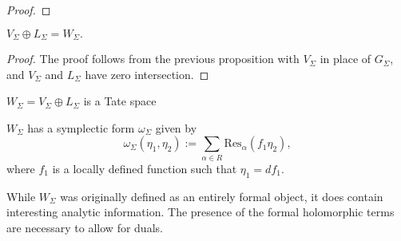 \begin{proof}
        
        
        
        
        
        
        \end{proof}
        
        \begin{corollary}
        \( V_\Sigma \oplus L_\Sigma = W_\Sigma. \) 
        \end{corollary}
        
        \begin{proof}
        The proof follows from the previous proposition with \(V_\Sigma\) in place of \(G_\Sigma\), and \(V_\Sigma\) and \(L_\Sigma\) have zero intersection.
        \end{proof}


        \begin{prop} \(W_\Sigma = V_\Sigma \oplus L_\Sigma \) is a Tate space 
        \end{prop}
        
        \begin{prop} \(W_\Sigma\) has a symplectic form \( \omega_\Sigma\) given by 
        \[ \omega_\Sigma ( \eta_1, \eta_2) := \sum_{\alpha \in R} \mathrm{Res}_{ \alpha } ( f_1 \eta_2),\]
        where \(f_1\) is a locally defined function such that \(\eta_1 =df_1\). 
        \end{prop}


        While \( W_\Sigma\) was originally defined as an entirely formal object, it does contain interesting analytic information. The presence of the formal holomorphic terms are necessary to allow for duals. 

